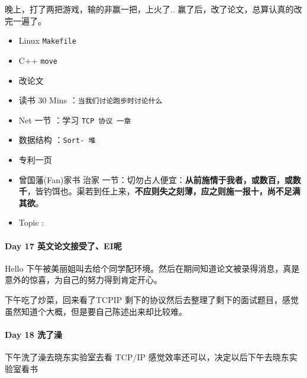 \documentclass[UTF8,a4paper,8pt]{ctexart}
\begin{document}
	 	 
	 	 晚上，打了两把游戏，输的非赢一把，上火了.. 赢了后，改了论文，总算认真的改完一遍了。
	 	  \begin{itemize}[itemindent = 1em]
	 	  	\renewcommand\labelitemi{\makebox[0pt][l]{$\square$}\hspace{1em}} 
	 	  	\renewcommand\labelitemi{\makebox[0pt][l]{$\square$}\raisebox{.15ex}{\hspace{0.1em}$\checkmark$}}	 	
	 	  	\item   Linux \verb|Makefile|
	 	  	\item   C++   \verb|move|
	 	  	\item   改论文
	 	  	
	 	  	\item   读书  30 Mins	：\verb|当我们讨论跑步时讨论什么|
	 	  	\item   Net 一节 ：学习 \verb|TCP 协议 一章|	
	 	  	
	 	  	\renewcommand\labelitemi{\makebox[0pt][l]{$\square$}\hspace{1em}} 
	 	  	\item   数据结构 ：\verb|Sort- 堆|
	 	  	\item   专利一页	
	 	  	
	 	  	\renewcommand\labelitemi{\makebox[0pt][l]{$\square$}\raisebox{.15ex}{\hspace{0.1em}$\checkmark$}}
	 	  	\item   曾国藩(Fan)家书 治家 一节：切勿占人便宜：\textbf{从前施情于我者，或数百，或数千}，皆钓饵也。渠若到任上来，\textbf{不应则失之刻薄，应之则施一报十，尚不足满其欲}。
	 	  	\item   Topic :
	 	  \end{itemize}
 	 \paragraph{Day 17  英文论文接受了、EI呢    \quad     }
		 	 Hello 下午被美丽姐叫去给个同学配环境。然后在期间知道论文被录得消息，真是意外的惊喜，为自己的努力得到肯定开心。
		 	 
		 	 下午吃了炒菜，回来看了TCPIP 剩下的协议然后去整理了剩下的面试题目，感觉虽然知道个大概，但是要自己陈述出来却比较难。
 	 \paragraph{Day 18   洗了澡   \quad     }
	 	 下午洗了澡去晓东实验室去看 TCP/IP  感觉效率还可以，决定以后下午去晓东实验室看书
	 	 
\end{document}
